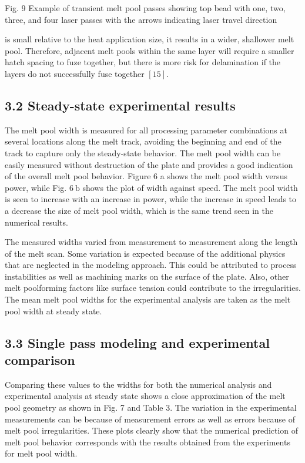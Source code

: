 \documentclass[10pt]{article}
\begin{document}
Fig. 9 Example of transient melt pool passes showing top bead with one, two, three, and four laser passes with the arrows indicating laser travel direction

is small relative to the heat application size, it results in a wider, shallower melt pool. Therefore, adjacent melt pools within the same layer will require a smaller hatch spacing to fuze together, but there is more risk for delamination if the layers do not successfully fuse together $[15]$.

\subsection*{3.2 Steady-state experimental results}
The melt pool width is measured for all processing parameter combinations at several locations along the melt track, avoiding the beginning and end of the track to capture only the steady-state behavior. The melt pool width can be easily measured without destruction of the plate and provides a good indication of the overall melt pool behavior. Figure 6 a shows the melt pool width versus power, while Fig. $6 \mathrm{~b}$ shows the plot of width against speed. The melt pool width is seen to increase with an increase in power, while the increase in speed leads to a decrease the size of melt pool width, which is the same trend seen in the numerical results.

The measured widths varied from measurement to measurement along the length of the melt scan. Some variation is expected because of the additional physics that are neglected in the modeling approach. This could be attributed to process instabilities as well as machining marks on the surface of the plate. Also, other melt poolforming factors like surface tension could contribute to the irregularities. The mean melt pool widths for the experimental analysis are taken as the melt pool width at steady state.

\subsection*{3.3 Single pass modeling and experimental comparison}
Comparing these values to the widths for both the numerical analysis and experimental analysis at steady state shows a close approximation of the melt pool geometry as shown in Fig. 7 and Table 3. The variation in the experimental measurements can be because of measurement errors as well as errors because of melt pool irregularities. These plots clearly show that the numerical prediction of melt pool behavior corresponds with the results obtained from the experiments for melt pool width.
\end{document}
